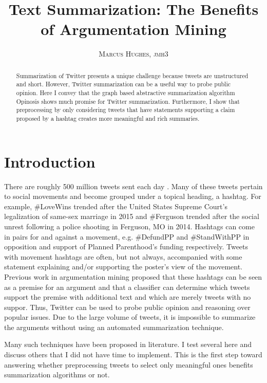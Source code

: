 \documentclass[paper=letter, fontsize=12pt]{article}
\title{\vspace{-15mm}\fontsize{24pt}{10pt}\selectfont\textbf{Text Summarization: The Benefits of Argumentation Mining}} %
\author{
\large
{\textsc{Marcus Hughes, jmh3 }}\\[2mm]
}
\date{}
\begin{document}
\maketitle %
\thispagestyle{fancy} %


\begin{abstract}
Summarization of Twitter presents a unique challenge because tweets are unstructured and short. However, Twitter summarization can be a useful way to probe public opinion. Here I convey that the graph based abstractive summarization algorithm Opinosis shows much promise for Twitter summarization. Furthermore, I show that preprocessing by only considering tweets that have statements supporting a claim proposed by a hashtag creates more meaningful and rich summaries. 
\end{abstract}

\section{Introduction}
There are roughly 500 million tweets sent each day \cite{Edwards2016}. Many of these tweets pertain to social movements and become grouped under a topical heading, a hashtag. For example, \#LoveWins trended after the United States Supreme Court's legalization of same-sex marriage in 2015 and \#Ferguson trended after the social unrest following a police shooting in Ferguson, MO in 2014. Hashtags can come in pairs for and against a movement, e.g. \#DefundPP and \#StandWithPP in opposition and support of Planned Parenthood's funding respectively. Tweets with movement hashtags are often, but not always, accompanied with some statement explaining and/or supporting the poster's view of the movement. Previous work \cite{Acl2016} in argumentation mining proposed that these hashtags can be seen as a premise for an argument and that a classifier can determine which tweets support the premise with additional text and which are merely tweets with no suppor. Thus, Twitter can be used to probe public opinion and reasoning over popular issues. Due to the large volume of tweets, it is impossible to summarize the arguments without using an automated summarization technique.

Many such techniques have been proposed in literature. I test several here and discuss others that I did not have time to implement. This is the first step toward answering whether preprocessing tweets to select only meaningful ones benefits summarization algorithms or not. 
\end{document}
